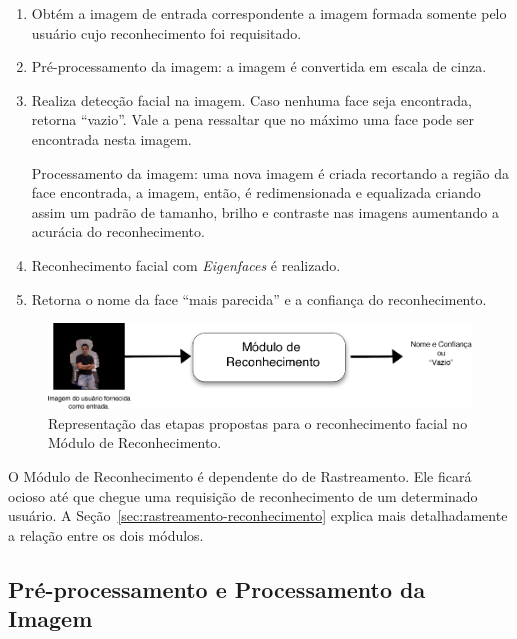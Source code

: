 		\begin{enumerate}
			\item Obtém a imagem de entrada correspondente a imagem formada somente pelo usuário cujo reconhecimento foi requisitado.
			\item \label{item:pre-processamento} Pré-processamento da imagem: a
			imagem é convertida em escala de cinza.
			\item Realiza detecção facial na imagem. Caso nenhuma face seja encontrada, retorna ``vazio''. Vale a pena ressaltar que no máximo uma face pode ser encontrada nesta imagem.
			\begin{item} 
				Processamento da imagem: uma nova imagem é criada recortando a região da
				face encontrada, a imagem, então, é redimensionada e equalizada criando
				assim um padrão de tamanho, brilho e  contraste nas imagens aumentando a
				acurácia do reconhecimento. 
				\label{processamento}  
			\end{item}
			\item Reconhecimento facial com \textit{Eigenfaces} é realizado.
			\item Retorna o nome da face ``mais parecida'' e a confiança do reconhecimento.
		\end{enumerate}

		\begin{figure}[hbt]
			\begin{center}
				\includegraphics[scale=2.0]{figuras/4.ProblemaEProposta/reconhecimento-simples.png}
			\end{center}
			\caption{Representação das etapas propostas para o reconhecimento facial no Módulo de Reconhecimento.}
			\label{fig:processo-reconhecimento}
		\end{figure}

	O Módulo de Reconhecimento é dependente do de Rastreamento. Ele ficará ocioso até que chegue uma requisição de reconhecimento de um determinado usuário. A Seção~\ref{sec:rastreamento-reconhecimento} explica mais detalhadamente a relação entre os dois módulos.

	\subsection{Pré-processamento e Processamento da Imagem}
		
